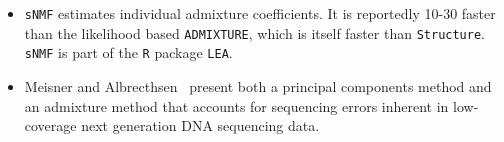 \begin{itemize}

\item {\tt sNMF} estimates individual admixture coefficients. It is
  reportedly 10-30 faster than the likelihood based {\tt ADMIXTURE},
  which is itself faster than {\tt Structure}. {\tt sNMF} is part of
  the {\tt R} package {\tt LEA}.

\item Meisner and Albrecthsen~\cite{Meisner-Albrechtsen-2018} present
  both a principal components method and an admixture method that
  accounts for sequencing errors inherent in low-coverage next
  generation DNA sequencing data.

\end{itemize}

